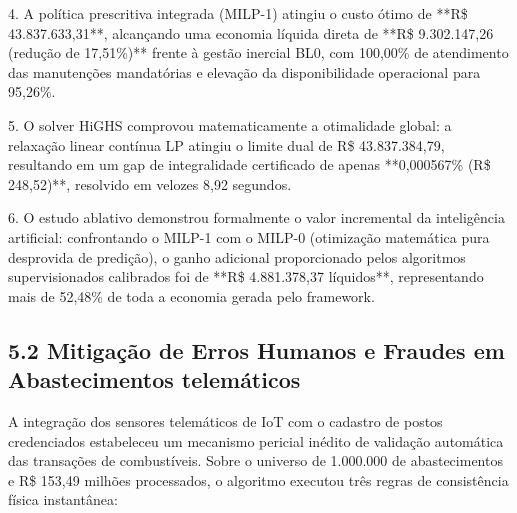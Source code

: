 \documentclass[10pt,a4paper,journal]{article}
\begin{document}
4. A política prescritiva integrada (MILP-1) atingiu o custo ótimo de **R\$ 43.837.633,31**, alcançando uma economia líquida direta de **R\$ 9.302.147,26 (redução de 17,51\%)** frente à gestão inercial BL0, com 100,00\% de atendimento das manutenções mandatórias e elevação da disponibilidade operacional para 95,26\%.

5. O solver HiGHS comprovou matematicamente a otimalidade global: a relaxação linear contínua LP atingiu o limite dual de R\$ 43.837.384,79, resultando em um gap de integralidade certificado de apenas **0,000567\% (R\$ 248,52)**, resolvido em velozes 8,92 segundos.

6. O estudo ablativo demonstrou formalmente o valor incremental da inteligência artificial: confrontando o MILP-1 com o MILP-0 (otimização matemática pura desprovida de predição), o ganho adicional proporcionado pelos algoritmos supervisionados calibrados foi de **R\$ 4.881.378,37 líquidos**, representando mais de 52,48\% de toda a economia gerada pelo framework.

\subsection{5.2 Mitigação de Erros Humanos e Fraudes em Abastecimentos telemáticos}
A integração dos sensores telemáticos de IoT com o cadastro de postos credenciados estabeleceu um mecanismo pericial inédito de validação automática das transações de combustíveis. Sobre o universo de 1.000.000 de abastecimentos e R\$ 153,49 milhões processados, o algoritmo executou três regras de consistência física instantânea:
\end{document}
